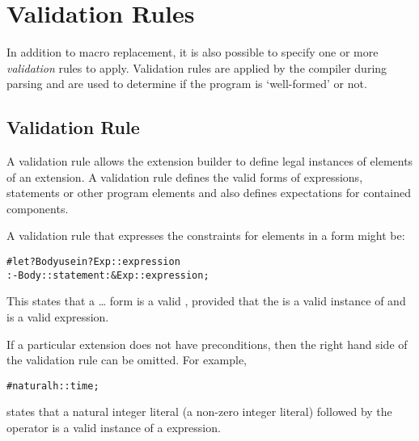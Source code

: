 \chapter{Validation Rules}
\label{validation}

In addition to macro replacement, it is also possible to specify one or more \emph{validation} rules to apply. Validation rules are applied by the compiler during parsing and are used to determine if the program is `well-formed' or not.


\section{Validation Rule}
\label{ValidationRule}
A validation rule allows the extension builder to define legal instances of elements of an extension. A validation rule defines the valid forms of expressions, statements or other program elements and also defines expectations for contained components.

A validation rule that expresses the constraints for elements in a   form might be:
\begin{alltt}
# let ?Body use in ?Exp :: expression
  :- Body::statement :& Exp::expression;
\end{alltt}
This states that a \ldots{} form is a valid , provided that the  is a valid instance of  and  is a valid expression.

If a particular extension does not have preconditions, then the right hand side of the validation rule can be omitted. For example, 
\begin{alltt}
#natural h :: time;
\end{alltt}
states that a natural integer literal (a non-zero integer literal) followed by the  operator is a valid instance of a  expression.

